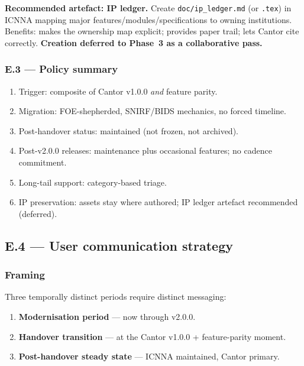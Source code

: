 \documentclass[11pt,a4paper]{article}
\begin{document}
\textbf{Recommended artefact: IP ledger.} Create \texttt{doc/ip\_ledger.md} (or \texttt{.tex}) in ICNNA mapping major features/modules/specifications to owning institutions. Benefits: makes the ownership map explicit; provides paper trail; lets Cantor cite correctly. \textbf{Creation deferred to Phase~3 as a collaborative pass.}

\subsubsection{E.3 --- Policy summary}

\begin{enumerate}
    \item Trigger: composite of Cantor v1.0.0 \emph{and} feature parity.
    \item Migration: FOE-shepherded, SNIRF/BIDS mechanics, no forced timeline.
    \item Post-handover status: maintained (not frozen, not archived).
    \item Post-v2.0.0 releases: maintenance plus occasional features; no cadence commitment.
    \item Long-tail support: category-based triage.
    \item IP preservation: assets stay where authored; IP ledger artefact recommended (deferred).
\end{enumerate}

\subsection{E.4 --- User communication strategy}

\subsubsection{Framing}

Three temporally distinct periods require distinct messaging:

\begin{enumerate}[nosep]
    \item \textbf{Modernisation period} --- now through v2.0.0.
    \item \textbf{Handover transition} --- at the Cantor v1.0.0 + feature-parity moment.
    \item \textbf{Post-handover steady state} --- ICNNA maintained, Cantor primary.
\end{enumerate}
\end{document}
